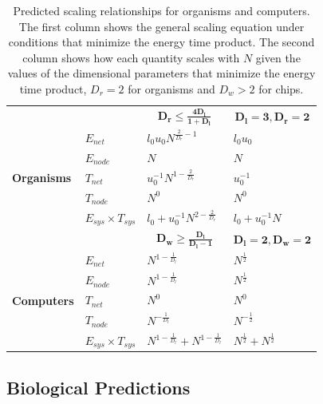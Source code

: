 \documentclass[12pt]{article}
\begin{document}
\begin{table}
\centering
\begin{tabular}{l|l||l|l|}
\multicolumn{2}{l}{} & \multicolumn{1}{c}{$\mathbf{D_r \leq \frac{4D_l}{1+D_l}}$} & \multicolumn{1}{c}{$\mathbf{D_l=3, D_r=2}$}\\
  \cline{2-4}
\multirow{5}{*}{\textbf{Organisms}} & $E_{net}$ &$l_0u_0 N^{\frac{2}{D_r}-1}$ &  $l_0 u_0$\\
\cline{2-4}
& $E_{node}$ &  $N$ & $N$ \\
\cline{2-4}
& $T_{net}$ & $u_0^{-1}N^{1-\frac{2}{D_r}}$ & $u_0^{-1}$\\
\cline{2-4}
& $T_{node}$ & $N^0$ & $N^0$ \\  

\cline{2-4}
& $E_{sys} \times T_{sys}$ & $l_0 + u_0^{-1}N^{2-\frac{2}{D_r}}$& $l_0 + u_0^{-1} N$\\
\cline{2-4}
\multicolumn{2}{c}{}  & \multicolumn{1}{c}{$\mathbf{D_w \geq \frac{D_l}{D_l-1}}$} & \multicolumn{1}{c}{$\mathbf{D_l=2,D_w =2}$} \\
\cline{2-4}

\multirow{5}{*}{\textbf{Computers}} & $E_{net}$ & $N^{1-\frac{1}{D_l}}$& $N^{\frac{1}{2}}$\\
\cline{2-4}
& $E_{node}$&$N^{1-\frac{1}{D_l}}$ &$N^{\frac{1}{2}}$ \\
\cline{2-4}
& $T_{net}$ & $N^{0}$& $N^{0}$\\
\cline{2-4}
& $T_{node}$& $N^{-\frac{1}{D_l}}$& $N^{-\frac{1}{2}}$\\
\cline{2-4}
& $E_{sys} \times T_{sys}$ &$N^{1-\frac{1}{D_l}} + N^{1-\frac{1}{D_l}}$ &$N^{\frac{1}{2}} + N^{\frac{1}{2}}$ \\
\cline{2-4}
\end{tabular}
\caption{Predicted scaling relationships for organisms and computers. The first column shows the general scaling equation under conditions that minimize the energy time product. The second column shows how each quantity scales with $N$ given the values of the dimensional parameters that minimize the energy time product, $D_r = 2$ for organisms and $D_w > 2$ for chips. 
\label{tab:SummaryScalingPredictions}}
\end{table}

\subsection{Biological Predictions}
\label{sec:bio-predictions}
\end{document}
